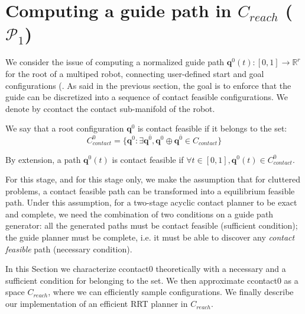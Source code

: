 \section{Computing a guide path in $C_{reach}$ ($\mathcal{P}_1$) }
\label{rbprm}

We consider the issue of computing a normalized guide path $\mathbf{q}^0(t) : [0,1] \longrightarrow \mathbb{R}^r$ for the root of a multiped robot, connecting user-defined start and goal configurations (. As said in the previous section, the goal is to enforce that the guide can be discretized into a sequence of \gls{contact feasible} configurations. We denote by \gls{ccontact} the contact sub-manifold of the robot.

We say that a root configuration $\mathbf{q}^{0}$ is \gls{contact feasible} if it belongs to the set:
\begin{equation}
      C_{contact}^0= \{ \mathbf{q}^{0}: \exists \mathbf{q}^{\overline{0}}, \mathbf{q}^{0} \oplus \mathbf{q}^{\overline{0}} \in C_{contact} \}
    \label{eq:pi}
\end{equation}

By extension, a path $\mathbf{q}^0(t)$ is \gls{contact feasible} if $\forall t \in [0,1], \mathbf{q}^0(t) \in C_{contact}^0$.

For this stage, and for this stage only, we make the assumption that for \gls{cluttered} problems, a \gls{contact feasible} path can be transformed into a \gls{equilibrium feasible} path.
Under this assumption, for a two-stage acyclic contact planner to be exact and complete, we need the combination of two conditions on a guide path generator: all the generated paths must be \gls{contact feasible} (sufficient condition); the guide planner must be complete, i.e. it must be able to discover any \textit{contact feasible} path (necessary condition).

In this Section we characterize \gls{ccontact0} theoretically with a necessary and a sufficient condition for belonging to the set.
We then approximate \gls{ccontact0} as a space $C_{reach}$, where we can efficiently sample configurations.
We finally describe our implementation of an efficient RRT planner in $C_{reach}$.

   
 

